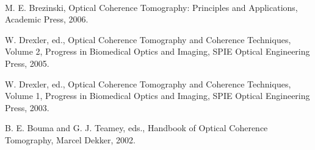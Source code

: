 \documentclass{article}
\numberwithin{figure}{subsection}
\numberwithin{table}{subsection}
\begin{document}
\begin{spacing}{0.5}
\begin{hangparas}{0.25cm}{1}
\bigbreak{}\\
\par M. E. Brezinski, Optical Coherence Tomography: Principles and Applications, Academic Press,
2006.\\
\par W. Drexler, ed., Optical Coherence Tomography and Coherence Techniques, Volume 2, Progress in Biomedical Optics and Imaging, SPIE Optical Engineering Press, 2005.\\
\par W. Drexler, ed., Optical Coherence Tomography and Coherence Techniques, Volume 1, Progress in
Biomedical Optics and Imaging, SPIE Optical Engineering Press, 2003.\\
\par B. E. Bouma and G. J. Teamey, eds., Handbook of Optical Coherence Tomography, Marcel Dekker,
2002.\\



\end{hangparas}
\end{spacing}
\end{document}
